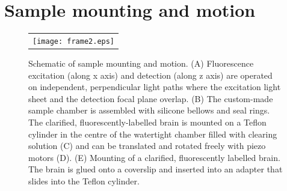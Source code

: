 \documentclass[12pt]{spieman}  %
\begin{document}
\section{Sample mounting and motion}
%
		
\begin{figure}
   \begin{center}
   \begin{tabular}{c}
   \texttt{[image: frame2.eps]}
   \end{tabular}
   \end{center}
   \caption{\label{fig:frame2} Schematic of sample mounting and motion. (A) Fluorescence excitation (along x axis) and detection (along z axis) are operated on independent, perpendicular light paths where the excitation light sheet and the detection focal plane overlap. (B) The custom-made sample chamber is assembled with silicone bellows and seal rings. The clarified, fluorescently-labelled brain is mounted on a Teflon cylinder in the centre of the watertight chamber filled with clearing solution (C) and can be translated and rotated freely with piezo motors (D). (E) Mounting of a clarified, fluorescently labelled brain. The brain is glued onto a coverslip and inserted into an adapter that slides into the Teflon cylinder.} 
   \end{figure}		
\end{document}
